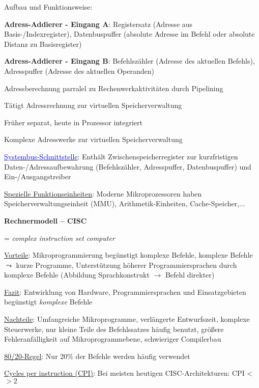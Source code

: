 \begin{items}
	\item Aufbau und Funktionsweise:
	\begin{items}
		\item \textbf{Adress-Addierer - Eingang A}: Registersatz (Adresse aus Basis-/Indexregister), Datenbuspuffer (absolute Adresse im Befehl oder absolute Distanz zu Basisregister)
		\item \textbf{Adress-Addierer - Eingang B}: Befehlszähler (Adresse des aktuellen Befehls), Adresspuffer (Adresse des aktuellen Operanden)
		\item Adressberechnung parralel zu Rechenwerkaktivitäten durch Pipelining
		\item Tätigt Adressrechnung zur virtuellen Speicherverwaltung
		\item Früher separat, heute in Prozessor integriert
		\item Komplexe Adresswerke zur virtuellen Speicherverwaltung
	\end{items}

	\item \underline{\textcolor{blue}{Systembus-Schnittstelle}}: Enthält Zwischenspeicherregister zur kurzfristigen Daten-/Adressaufbewahrung (Befehlszähler, Adresspuffer, Datenbuspuffer) und Ein-/Ausgangstreiber

	\item \underline{Spezielle Funktionseinheiten}: Moderne Mikroprozessoren haben Speicherverwaltungseinheit (MMU), Arithmetik-Einheiten, Cache-Speicher,...
\end{items}

\newpage

\textbf{Rechnermodell -- CISC}
\begin{items}
	\item = \emph{complex instruction set computer}
	\item \underline{Vorteile}: Mikroprogrammierung begünstigt komplexe Befehle, komplexe Befehle $\leadsto$ kurze Programme, Unterstützung höherer Programmiersprachen durch komplexe Befehle (Abbildung Sprachkonstrukt $\to$ Befehl direkter)
	\item \underline{Fazit}: Entwirklung von Hardware, Programmiersprachen und Einsatzgebieten begünstigt \emph{komplexe} Befehle
	\item \underline{Nachteile}: Umfangreiche Mikroprogramme, verlängerte Entwurfszeit, komplexe Steuerwerke, nur kleine Teile des Befehlssatzes häufig benutzt, größere Fehleranfälligkeit auf Mikroprogrammebene, schwieriger Compilerbau
	\item \underline{80/20-Regel}: Nur 20\% der Befehle werden häufig verwendet
	\item \underline{Cycles per instruction (CPI)}: Bei meisten heutigen CISC-Architekturen: CPI <$>2$
\end{items}

